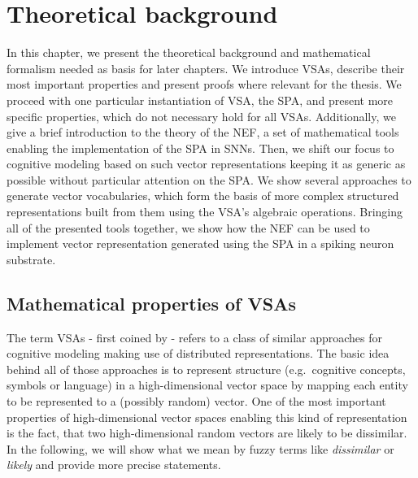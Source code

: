 \chapter{Theoretical background}%
\label{chap:introduction_to_vsas}

In this chapter, we present the theoretical background and mathematical formalism needed as basis for later chapters.
We introduce \acfp{VSA}, describe their most important properties and present proofs where relevant for the thesis.
We proceed with one particular instantiation of \ac{VSA}, the \acf{SPA}, and present more specific properties, which do not necessary hold for all \acp{VSA}.
Additionally, we give a brief introduction to the theory of the \acf{NEF}, a set of mathematical tools enabling the implementation of the \ac{SPA} in \acp{SNN}.
Then, we shift our focus to cognitive modeling based on such vector representations keeping it as generic as possible without particular attention on the \ac{SPA}. 
We show several approaches to generate vector vocabularies, which form the basis of more complex structured representations built from them using the \ac{VSA}'s algebraic operations.
Bringing all of the presented tools together, we show how the \ac{NEF} can be used to implement vector representation generated using the \ac{SPA} in a spiking neuron substrate.

\section{Mathematical properties of \aclp{VSA}}
\label{sec:math_prop_vsas}

The term \acp{VSA} - first coined by \textcite{Gayler2003} - refers to a class of similar approaches for cognitive modeling making use of distributed representations.
The basic idea behind all of those approaches is to represent structure (e.g.\ cognitive concepts, symbols or language) in a high-dimensional vector space by mapping each entity to be represented to a (possibly random) vector.
One of the most important properties of high-dimensional vector spaces enabling this kind of representation is the fact, that two high-dimensional random vectors are likely to be dissimilar.
In the following, we will show what we mean by fuzzy terms like \emph{dissimilar} or \emph{likely} and provide more precise statements.

